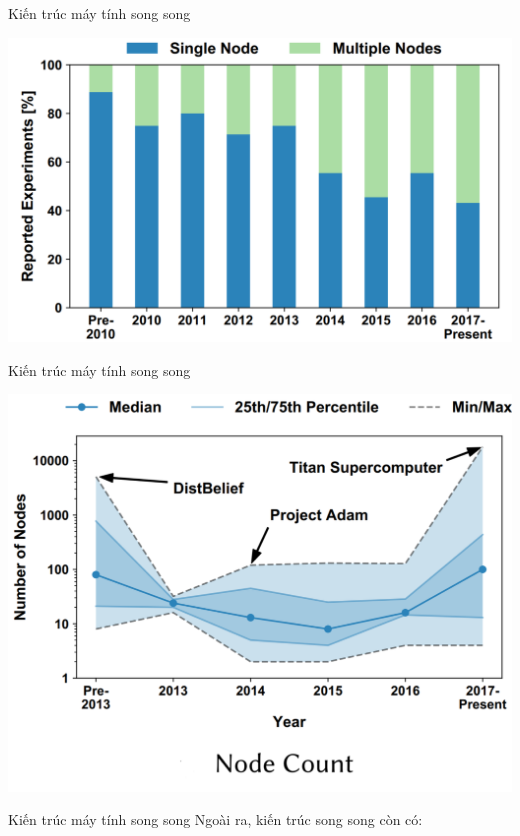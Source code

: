 \documentclass[notheorems,hyperref={bookmarks=true}]{beamer}
\theoremstyle{plain}
\numberwithin{equation}{section}
\begin{document}
\begin{footnotesize}
\begin{frame}{Kiến trúc máy tính song song}
\begin{center}
\includegraphics[scale=0.4]{multiNode.PNG}
\end{center}
\end{frame}

\begin{frame}{Kiến trúc máy tính song song}
\begin{center}
\includegraphics[scale=0.4]{multiNode2.PNG}
\end{center}
\end{frame}

\begin{frame}{Kiến trúc máy tính song song}
Ngoài ra, kiến trúc song song còn có:\\


\end{frame}
\end{footnotesize}
\end{document}
